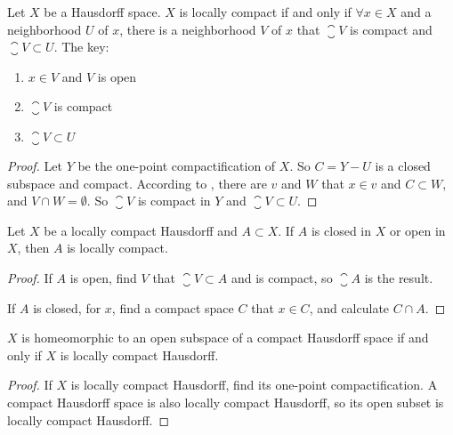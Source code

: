 \begin{theorem}
    Let $X$ be a Hausdorff space. $X$ is locally compact if and only if $\forall x \in X$ and a neighborhood $U$ of $x$, there is a neighborhood $V$ of $x$ that $\closure{V}$ is compact and $\closure{V} \subset U$.
    The key:
    \begin{enumerate}
        \item $x \in V$  and $V$ is open
        \item $\closure{V}$ is compact
        \item $\closure{V} \subset U$
    \end{enumerate}
\end{theorem}
\begin{proof}
    Let $Y$ be the one-point compactification of $X$. So $C = Y - U$ is a closed subspace and compact. According to , there are $v$ and $W$ that $x \in v$ and $C \subset W$, and $V \cap W = \emptyset$. So $\closure{V}$ is compact in $Y$ and $\closure{V} \subset U$.
\end{proof}

\begin{theorem}
    Let $X$ be a locally compact Hausdorff and $A \subset X$. If $A$ is closed in $X$ or open in $X$, then $A$ is locally compact.
\end{theorem}
\begin{proof}
    If $A$ is open, find $V$ that $\closure{V} \subset A$ and is compact, so $\closure{A}$ is the result. 
    
    If $A$ is closed, for $x$, find a compact space $C$ that $x \in C$, and calculate $C \cap A$.
\end{proof}

\begin{theorem}
    $X$ is homeomorphic to an open subspace of a compact Hausdorff space if and only if $X$ is locally compact Hausdorff.
\end{theorem}
\begin{proof}
    If $X$ is locally compact Hausdorff, find its one-point compactification. A compact Hausdorff space is also locally compact Hausdorff, so its open subset is locally compact Hausdorff.
\end{proof}





